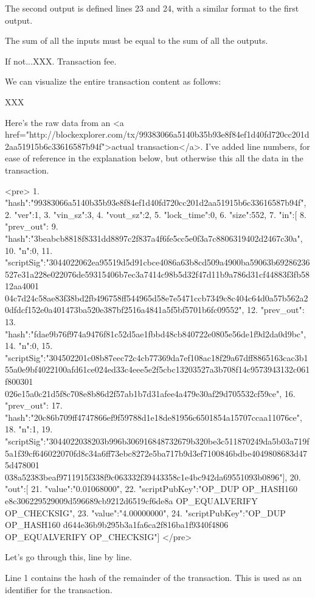\documentclass[12pt]{book}
\begin{document}
The second output is defined lines 23 and 24, with a similar format to
the first output.

The sum of all the inputs must be equal to the sum of all the outputs.

If not...XXX.  Transaction fee.


We can visualize the entire transaction content as follows:

XXX



Here's the raw data from an <a
href="http://blockexplorer.com/tx/99383066a5140b35b93e8f84ef1d40fd720cc201d2aa51915b6c33616587b94f">actual
transaction</a>.  I've added line numbers, for ease of reference in
the explanation below, but otherwise this all the data in the
transaction.

<pre>
1. {"hash":"99383066a5140b35b93e8f84ef1d40fd720cc201d2aa51915b6c33616587b94f",
2. "ver":1,
3. "vin_sz":3,
4.  "vout_sz":2,
5.  "lock_time":0,
6.  "size":552,
7.  "in":[
8.    {"prev_out":{
9.      "hash":"3beabcb8818f8331dd8897c2f837a4f6fe5cc5e0f3a7c8806319402d2467c30a",
10.        "n":0},
11.     "scriptSig":"3044022062ea95519d5d91cbce4086a63b8cd509a4900ba59063b69286236527e31a228e022076de59315406b7ec3a7414c98b5d32f47d11b9a786d31cf44883f3fb5812aa4001 04c7d24c58ae83f38bd2fb496758ff544965d58e7e5471ccb7349c8c404c64d0a57b562a20dfdcf152e0a401473ba520e387bf2516a4841a5f5bf5701b6fc09552"},
12.    {"prev_out":{
13.        "hash":"fdae9b76f974a9476f81c52d5ae1fbbd48cb840722e0805e56de1f9d2da0d9bc",
14.        "n":0},
15.      "scriptSig":"304502201c08b87eec72c4cb77369da7ef108ac18f29a67dff8865163cac3b155a0e9bf4022100afd61ce024ed33c4eee5e2f5cbc13203527a3b708f14c9573943132c061f800301 026e15a0c21d5f8c708e8b86d2f57ab1b7d31afee4a479e30af29d705532cf59ce"},
16.    {"prev_out":{
17.        "hash":"20c86b709ff4747866ef9f59788d1e18de81956c6501854a15707ccaa11076ce",
18.        "n":1},
19.      "scriptSig":"3044022038203b996b306916848732679b320be3c511870249da5b03a719f5a1f39cf646022070fd8c34a6ff73ebc8272e5ba717b9d3ef7100846bdbe4049808683d475d478001 038a52383beaf9711915f338f9c063332f39443358c1e4bc942da69551093b0896"}],
20.  "out":[
21.    {"value":"0.01068000",
22.      "scriptPubKey":"OP_DUP OP_HASH160 e8c306229529009d596689cb9212d6519cf6de8a OP_EQUALVERIFY OP_CHECKSIG"},
23.    {"value":"4.00000000",
24.      "scriptPubKey":"OP_DUP OP_HASH160 d644e36b9b295b3a1fa6ca2f816ba1f9340f4806 OP_EQUALVERIFY OP_CHECKSIG"}]}
</pre>

Let's go through this, line by line.

Line 1 contains the hash of the remainder of the transaction.  This is
used as an identifier for the transaction.
\end{document}
